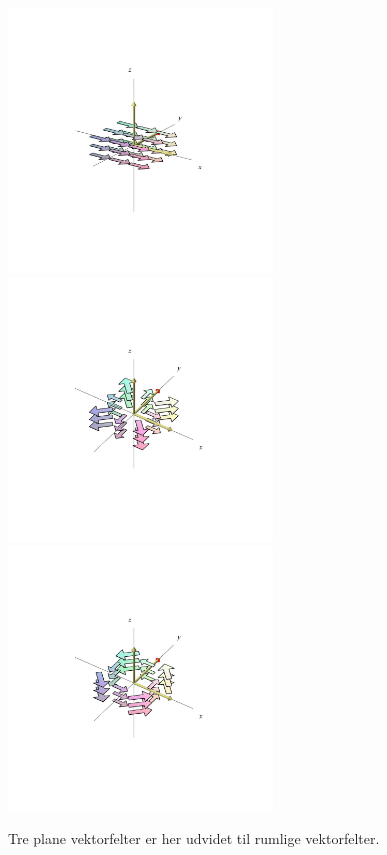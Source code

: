 \begin{figure}[ht]
\centerline{\includegraphics[height=70mm]{FIGS/plotVFUdvidet1}\includegraphics[height=70mm]{FIGS/plotVFUdvidet3}\includegraphics[height=70mm]{FIGS/plotVFUdvidet2}}
\begin{center}
\caption{\small{Tre plane vektorfelter er her udvidet til rumlige vektorfelter.}}
\label{figVFUdvidet}
\end{center}
\end{figure}


